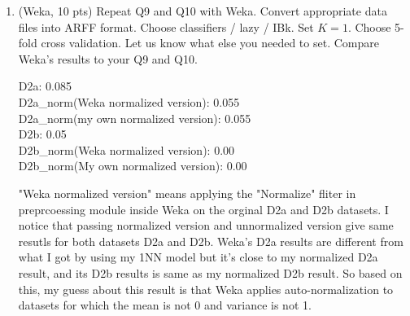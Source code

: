 \documentclass[a4paper]{article}
\theoremstyle{definition}
\newenvironment{soln}{
    \leavevmode\color{blue}\ignorespaces
}{}
\begin{document}
\begin{enumerate}
\item (Weka, 10 pts)
Repeat Q9 and Q10 with Weka.
Convert appropriate data files into ARFF format.
Choose classifiers / lazy / IBk.
Set $K=1$.
Choose 5-fold cross validation.
Let us know what else you needed to set.  Compare Weka's results to your Q9 and Q10.

\begin{soln}
D2a: 0.085\\
D2a\_norm(Weka normalized version): 0.055\\
D2a\_norm(my own normalized version): 0.055 \\
D2b: 0.05\\
D2b\_norm(Weka normalized version): 0.00\\
D2b\_norm(My own normalized version): 0.00

"Weka normalized version"  means applying the "Normalize" fliter in preprcoessing module inside Weka on the orginal D2a and D2b datasets.
I notice that passing normalized version and unnormalized version give same resutls for both datasets D2a and D2b.
Weka's D2a results are different from what I got by using my 1NN model but it's close to my normalized D2a result,  and its D2b results is same as my normalized D2b result.
So based on this, my guess about this result is that Weka applies auto-normalization to datasets for which the mean is not 0 and variance is not 1.
\end{soln}

\end{enumerate}


\end{document}
